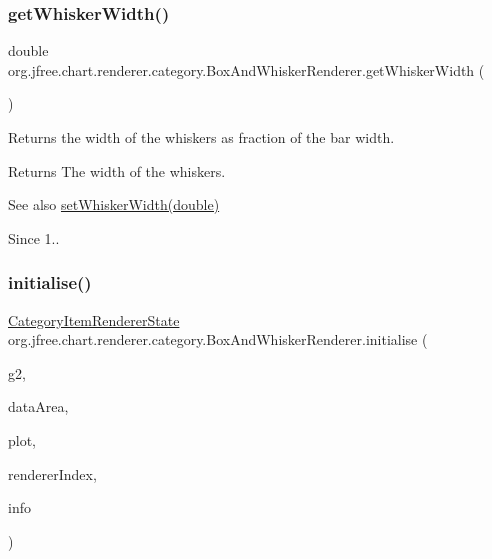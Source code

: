 \subsubsection{\texorpdfstring{get\+Whisker\+Width()}{getWhiskerWidth()}}
{\footnotesize\ttfamily double org.\+jfree.\+chart.\+renderer.\+category.\+Box\+And\+Whisker\+Renderer.\+get\+Whisker\+Width (\begin{DoxyParamCaption}{ }\end{DoxyParamCaption})}

Returns the width of the whiskers as fraction of the bar width.

\begin{DoxyReturn}{Returns}
The width of the whiskers.
\end{DoxyReturn}
\begin{DoxySeeAlso}{See also}
\mbox{\hyperlink{classorg_1_1jfree_1_1chart_1_1renderer_1_1category_1_1_box_and_whisker_renderer_a43add3f74f7d750c774198f910ad0bc1}{set\+Whisker\+Width(double)}}
\end{DoxySeeAlso}
\begin{DoxySince}{Since}
1.. 
\end{DoxySince}
\mbox{\label{classorg_1_1jfree_1_1chart_1_1renderer_1_1category_1_1_box_and_whisker_renderer_a408aa43577d1f5ed5af1685069a8c409}} 
\subsubsection{\texorpdfstring{initialise()}{initialise()}}
{\footnotesize\ttfamily \mbox{\hyperlink{classorg_1_1jfree_1_1chart_1_1renderer_1_1category_1_1_category_item_renderer_state}{Category\+Item\+Renderer\+State}} org.\+jfree.\+chart.\+renderer.\+category.\+Box\+And\+Whisker\+Renderer.\+initialise (\begin{DoxyParamCaption}\item[{Graphics2D}]{g2,  }\item[{Rectangle2D}]{data\+Area,  }\item[{\mbox{\hyperlink{classorg_1_1jfree_1_1chart_1_1plot_1_1_category_plot}{Category\+Plot}}}]{plot,  }\item[{int}]{renderer\+Index,  }\item[{\mbox{\hyperlink{classorg_1_1jfree_1_1chart_1_1plot_1_1_plot_rendering_info}{Plot\+Rendering\+Info}}}]{info }\end{DoxyParamCaption})}

